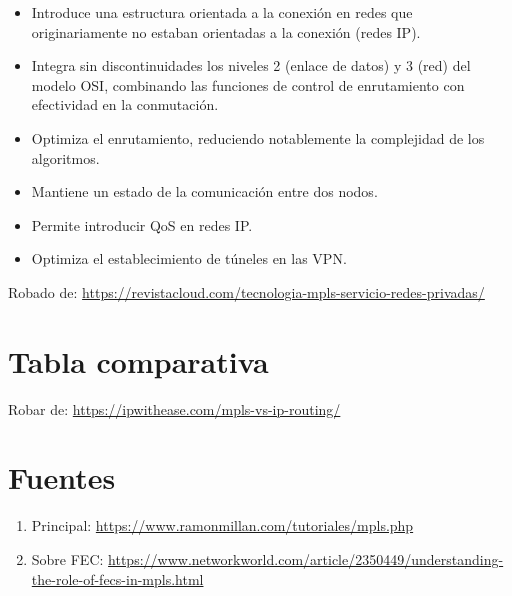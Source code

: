 \documentclass[a4paper]{article}
\begin{document}
\begin{itemize}
    \item Introduce una estructura orientada a la conexión en redes que originariamente no estaban orientadas a la conexión (redes IP).
    \item Integra sin discontinuidades los niveles 2 (enlace de datos) y 3 (red) del modelo OSI, combinando las funciones de control de enrutamiento con efectividad en la conmutación.
    \item Optimiza el enrutamiento, reduciendo notablemente la complejidad de los algoritmos.
    \item Mantiene un estado de la comunicación entre dos nodos.
    \item Permite introducir QoS en redes IP.
    \item Optimiza el establecimiento de túneles en las VPN.
    
\end{itemize}

Robado de: \url{https://revistacloud.com/tecnologia-mpls-servicio-redes-privadas/}


\section{Tabla comparativa}
Robar de: \url{https://ipwithease.com/mpls-vs-ip-routing/}

\section{Fuentes}
\begin{enumerate}
    \item Principal: \url{https://www.ramonmillan.com/tutoriales/mpls.php}
    \item Sobre FEC: \url{https://www.networkworld.com/article/2350449/understanding-the-role-of-fecs-in-mpls.html}
\end{enumerate}
\end{document}
